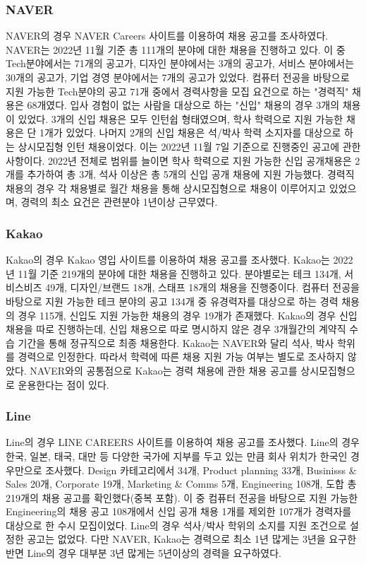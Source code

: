 \documentclass{pnu-survey}
\begin{document}
\subsubsection{NAVER}
NAVER의 경우 NAVER Careers 사이트를 이용하여 채용 공고를 조사하였다. NAVER는 2022년 11월 기준 총 111개의 분야에 대한 채용을 진행하고 있다. 이 중 Tech분야에서는 71개의 공고가, 디자인 분야에서는 3개의 공고가, 서비스 분야에서는 30개의 공고가, 기업 경영 분야에서는 7개의 공고가 있었다. 컴퓨터 전공을 바탕으로 지원 가능한 Tech분야의 공고 71개 중에서 경력사항을 모집 요건으로 하는 "경력직" 채용은 68개였다. 입사 경험이 없는 사람을 대상으로 하는 "신입" 채용의 경우 3개의 채용이 있었다. 3개의 신입 채용은 모두 인턴쉽 형태였으며, 학사 학력으로 지원 가능한 채용은 단 1개가 있었다. 나머지 2개의 신입 채용은 석/박사 학력 소지자를 대상으로 하는 상시모집형 인턴 채용이었다. 이는 2022년 11월 7일 기준으로 진행중인 공고에 관한 사항이다. 2022년 전체로 범위를 늘이면 학사 학력으로 지원 가능한 신입 공개채용은 2개를 추가하여 총 3개, 석사 이상은 총 5개의 신입 공개 채용에 지원 가능했다. 경력직 채용의 경우 각 채용별로 월간 채용을 통해 상시모집형으로 채용이 이루어지고 있었으며, 경력의 최소 요건은 관련분야 1년이상 근무였다.

\subsubsection{Kakao}
Kakao의 경우 Kakao 영입 사이트를 이용하여 채용 공고를 조사했다. Kakao는 2022년 11월 기준 219개의 분야에 대한 채용을 진행하고 있다. 분야별로는 테크 134개, 서비스비즈 49개, 디자인/브랜드 18개, 스태프 18개의 채용을 진행중이다. 컴퓨터 전공을 바탕으로 지원 가능한 테크 분야의 공고 134개 중 유경력자를 대상으로 하는 경력 채용의 경우 115개, 신입도 지원 가능한 채용의 경우 19개가 존재했다. Kakao의 경우 신입 채용을 따로 진행하는데, 신입 채용으로 따로 명시하지 않은 경우 3개월간의 계약직 수습 기간을 통해 정규직으로 최종 채용한다. Kakao는 NAVER와 달리 석사, 박사 학위를 경력으로 인정한다. 따라서 학력에 따른 채용 지원 가능 여부는 별도로 조사하지 않았다. NAVER와의 공통점으로 Kakao는 경력 채용에 관한 채용 공고를 상시모집형으로 운용한다는 점이 있다.

\subsubsection{Line}
Line의 경우 LINE CAREERS 사이트를 이용하여 채용 공고를 조사했다. Line의 경우 한국, 일본, 태국, 대만 등 다양한 국가에 지부를 두고 있는 만큼 회사 위치가 한국인 경우만으로 조사했다. Design 카테고리에서 34개, Product planning 33개, Businisss \& Sales 20개, Corporate 19개, Marketing \& Comms 5개, Engineering 108개, 도합 총 219개의 채용 공고를 확인했다(중복 포함). 이 중 컴퓨터 전공을 바탕으로 지원 가능한 Engineering의 채용 공고 108개에서 신입 공개 채용 1개를 제외한 107개가 경력자를 대상으로 한 수시 모집이었다. Line의 경우 석사/박사 학위의 소지를 지원 조건으로 설정한 공고는 없었다. 다만 NAVER, Kakao는 경력으로 최소 1년 많게는 3년을 요구한 반면 Line의 경우 대부분 3년 많게는 5년이상의 경력을 요구하였다.
\end{document}
